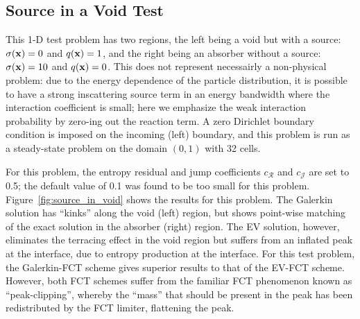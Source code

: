 \subsection{Source in a Void Test}
This 1-D test problem has two regions, the left being a void but with a source:
$\sigma(\mathbf{x})=0$ and $q(\mathbf{x})=1$, and the right being an absorber without a source:
$\sigma(\mathbf{x})=10$ and $q(\mathbf{x})=0$. This does not represent necessairly a non-physical problem:
due to the energy dependence of the particle distribution, it is possible to have
a strong inscattering source term in an energy bandwidth where the interaction coefficient is 
small; here we emphasize the weak interaction probability by zero-ing out the reaction term. 
A zero Dirichlet boundary condition is imposed on the incoming (left)
boundary, and this problem is run as a steady-state problem on the domain
$(0,1)$ with 32 cells.

For this problem, the entropy residual and jump coefficients $c_\mathcal{R}$
and $c_\mathcal{J}$ are set to 0.5; the default value of 0.1 was found
to be too small for this problem.
Figure~\ref{fig:source_in_void} shows the results for this problem.
The Galerkin solution has ``kinks'' along the void (left) region, but
shows point-wise matching of the exact solution in the absorber (right)
region. The EV solution, however, eliminates the terracing effect in
the void region but suffers from an inflated peak at the interface, due
to entropy production at the interface. For this test problem, the
Galerkin-FCT scheme gives superior results to that of the EV-FCT
scheme. However, both FCT schemes suffer from the familiar FCT
phenomenon known as ``peak-clipping'', whereby the ``mass'' that
should be present in the peak has been redistributed by the FCT
limiter, flattening the peak.

